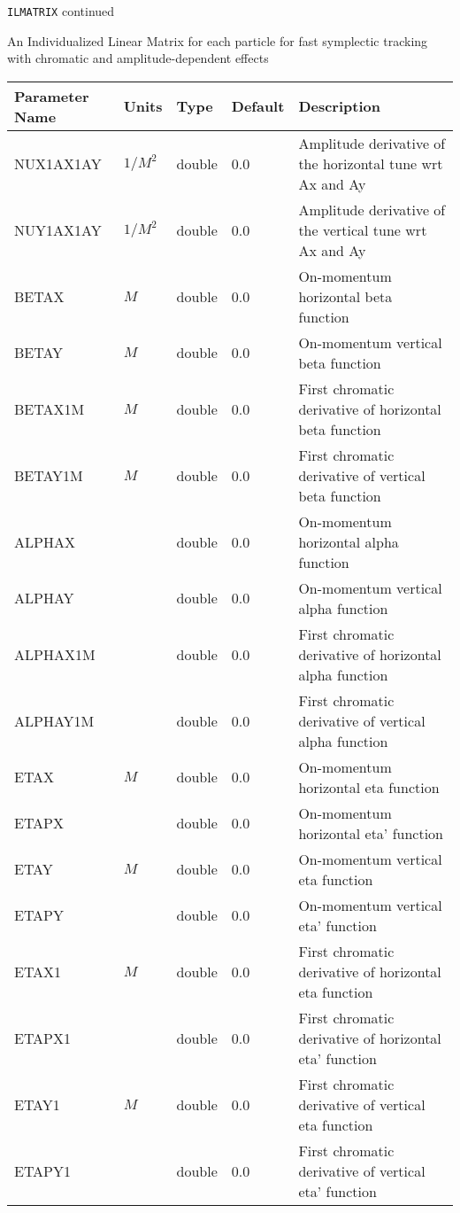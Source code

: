 \newpage
\begin{center}{\Large\verb|ILMATRIX| continued}\end{center}
An Individualized Linear Matrix for each particle for fast symplectic tracking with chromatic and amplitude-dependent effects
\\
\begin{tabular}{|l|l|l|l|p{\descwidth}|} \hline
Parameter Name & Units & Type & Default & Description \\ \hline 
NUX1AX1AY & $1/M^2$ & double &  0.0 & Amplitude derivative of the horizontal tune wrt Ax and Ay  \\ \hline 
NUY1AX1AY & $1/M^2$ & double &  0.0 & Amplitude derivative of the vertical tune wrt Ax and Ay  \\ \hline 
BETAX & $M$ & double &  0.0 & On-momentum horizontal beta function  \\ \hline 
BETAY & $M$ & double &  0.0 & On-momentum vertical beta function  \\ \hline 
BETAX1M & $M$ & double &  0.0 & First chromatic derivative of horizontal beta function  \\ \hline 
BETAY1M & $M$ & double &  0.0 & First chromatic derivative of vertical beta function  \\ \hline 
ALPHAX &  & double &  0.0 & On-momentum horizontal alpha function  \\ \hline 
ALPHAY &  & double &  0.0 & On-momentum vertical alpha function  \\ \hline 
ALPHAX1M &  & double &  0.0 & First chromatic derivative of horizontal alpha function  \\ \hline 
ALPHAY1M &  & double &  0.0 & First chromatic derivative of vertical alpha function  \\ \hline 
ETAX & $M$ & double &  0.0 & On-momentum horizontal eta function  \\ \hline 
ETAPX &  & double &  0.0 & On-momentum horizontal eta' function  \\ \hline 
ETAY & $M$ & double &  0.0 & On-momentum vertical eta function  \\ \hline 
ETAPY &  & double &  0.0 & On-momentum vertical eta' function  \\ \hline 
ETAX1 & $M$ & double &  0.0 & First chromatic derivative of horizontal eta function  \\ \hline 
ETAPX1 &  & double &  0.0 & First chromatic derivative of horizontal eta' function  \\ \hline 
ETAY1 & $M$ & double &  0.0 & First chromatic derivative of vertical eta function  \\ \hline 
ETAPY1 &  & double &  0.0 & First chromatic derivative of vertical eta' function  \\ \hline 
\end{tabular}

